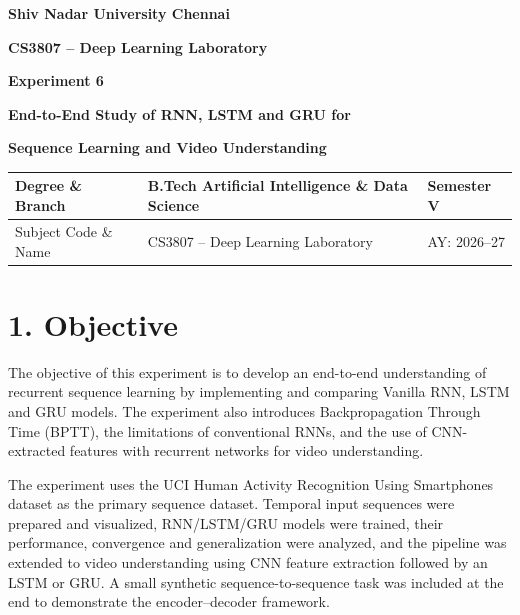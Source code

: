 \documentclass[10pt]{article}
\begin{document}

\begin{center}

{\large\textbf{Shiv Nadar University Chennai}}

\vspace{2mm}

{\normalsize\textbf{CS3807 -- Deep Learning Laboratory}}

\vspace{2mm}

{\large\textbf{Experiment 6}}

\vspace{1mm}

{\normalsize\textbf{End-to-End Study of RNN, LSTM and GRU for}}

{\normalsize\textbf{Sequence Learning and Video Understanding}}

\end{center}

\vspace{3mm}

\begin{tabular}{|p{3.4cm}|p{9.0cm}|p{1.4cm}|}
\hline
Degree \& Branch &
B.Tech Artificial Intelligence \& Data Science &
Semester V\\
\hline
Subject Code \& Name &
CS3807 -- Deep Learning Laboratory &
AY: 2026--27\\
\hline
\end{tabular}

\section*{1. Objective}

The objective of this experiment is to develop an end-to-end understanding of
recurrent sequence learning by implementing and comparing Vanilla RNN, LSTM
and GRU models. The experiment also introduces Backpropagation Through Time
(BPTT), the limitations of conventional RNNs, and the use of CNN-extracted
features with recurrent networks for video understanding.

The experiment uses the UCI Human Activity Recognition Using Smartphones
dataset as the primary sequence dataset. Temporal input sequences were
prepared and visualized, RNN/LSTM/GRU models were trained, their performance,
convergence and generalization were analyzed, and the pipeline was extended
to video understanding using CNN feature extraction followed by an LSTM or
GRU. A small synthetic sequence-to-sequence task was included at the end to
demonstrate the encoder--decoder framework.
\end{document}
